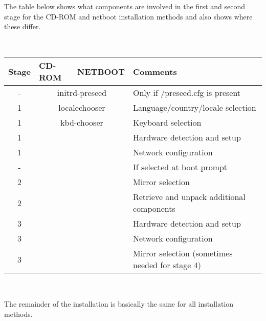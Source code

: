 \documentclass[a4paper,10pt]{article}
\begin{document}
The table below shows what components are involved in the first and second stage for the CD-ROM and netboot installation methods and also shows where these differ. 

\

\begin{tabular}{|c|p{3cm}|p{3cm}|p{8cm}|}
\hline
\textbf{Stage} & \centering\textbf{CD-ROM} & \centering\textbf{NETBOOT} & \textbf{Comments} \\
\hline
-  & \multicolumn{2}{c|}{initrd-preseed} & Only if /preseed.cfg is present \\
\hline
1  & \multicolumn{2}{c|}{localechooser} & Language/country/locale selection \\
\hline
1 & \multicolumn{2}{c|}{kbd-chooser} & Keyboard selection \\
\hline
1 & \centering{cdrom-detect} & \centering{eth-detect} & Hardware detection and setup \\
\hline
1 & & \centering{netcfg} & Network configuration \\
\hline
- & \centering{file-preseed} & \centering{network-preseed} & If selected at boot prompt \\
\hline
2 & & \centering{choose-mirror} & Mirror selection \\
\hline
2 & \centering{load-cdrom (anna)} & \centering{download-installer (anna)} & Retrieve and unpack additional components \\
\hline
3 & \centering{eth-detect} & & Hardware detection and setup \\
\hline
3 & \centering{netcfg} & & Network configuration \\
\hline
3 & \centering{choose-mirror} & & Mirror selection (sometimes needed for stage 4) \\
\hline
\end{tabular}

\

The remainder of the installation is basically the same for all installation methods. 

\
\end{document}
